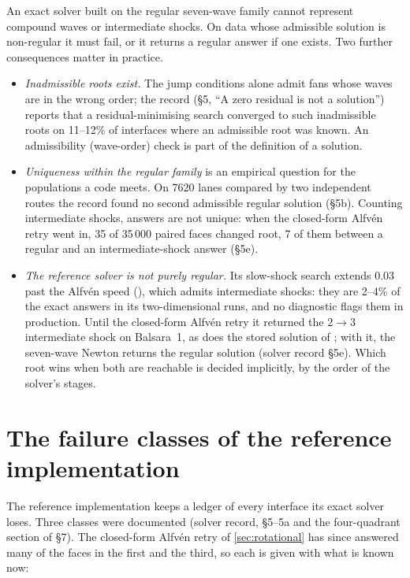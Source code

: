 \documentclass[11pt,a4paper,oneside,openany]{book}
\newcommand{\textcite}{\citet}
\theoremstyle{definition}
\theoremstyle{plain}
\theoremstyle{remark}
\newcommand{\code}[1]{\texttt{\detokenize{#1}}}
\begin{document}
An exact solver built on the regular seven-wave family cannot represent compound waves or
intermediate shocks. On data whose admissible solution is non-regular it must fail, or it
returns a regular answer if one exists. Two further consequences matter in practice.
\begin{itemize}[nosep]
\item \emph{Inadmissible roots exist.} The jump conditions alone admit fans whose waves are
  in the wrong order; the record (\S5, ``A zero residual is not a solution'') reports that
  a residual-minimising search converged to such inadmissible roots on 11--12\% of
  interfaces where an admissible root was known. An admissibility (wave-order) check is part
  of the definition of a solution.
\item \emph{Uniqueness within the regular family} is an empirical question for the
  populations a code meets. On 7620 lanes compared by two independent routes the record
  found no second admissible regular solution (\S5b). Counting intermediate shocks, answers
  are not unique: when the closed-form Alfvén retry went in, 35 of 35\,000 paired faces
  changed root, 7 of them between a regular and an intermediate-shock answer (\S5e).
\item \emph{The reference solver is not purely regular.} Its slow-shock search extends $0.03$
  past the Alfvén speed (\code{MARGIN}), which admits intermediate shocks: they are 2--4\%
  of the exact answers in its two-dimensional runs, and no diagnostic flags them in
  production. Until the closed-form Alfvén retry it returned the $2\to3$ intermediate shock
  on Balsara~1, as does the stored solution of \textcite{GiacomazzoRezzolla2006}; with it,
  the seven-wave Newton returns the regular solution (solver record \S5e). Which root wins
  when both are reachable is decided implicitly, by the order of the solver's stages.
\end{itemize}

\section{The failure classes of the reference implementation}\label{sec:failure-classes}

The reference implementation keeps a ledger of every interface its exact solver loses.
Three classes were documented (solver record, \S5--5a and the four-quadrant section of
\S7). The closed-form Alfvén retry of \cref{sec:rotational} has since answered many of the
faces in the first and the third, so each is given with what is known now:
\end{document}
